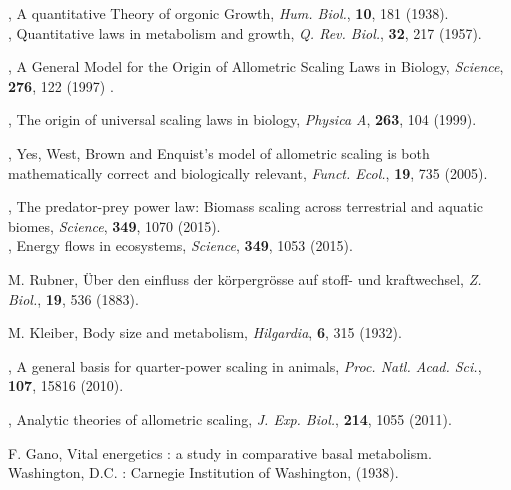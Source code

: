 \documentclass[10pt]{iopart}
\begin{document}
%
\begin{thebibliography}{100}

, {A quantitative Theory of orgonic Growth}, \textit{Hum. Biol.}, \textbf{10}, {181} {(1938)}. \\

, {Quantitative laws in metabolism and growth}, \textit{Q. Rev. Biol.}, \textbf{32}, {217} {(1957)}.

, {A General Model for the Origin of Allometric Scaling Laws in Biology}, \textit{Science}, \textbf{276}, {122} {(1997)} .

, { The origin of universal scaling laws in biology}, \textit{Physica A}, \textbf{263}, {104} {(1999)}.

, {Yes, West, Brown and Enquist's model of allometric scaling is both mathematically correct and biologically relevant}, \textit{Funct. Ecol.}, \textbf{19}, 735 {(2005)}.

, {The predator-prey power law: Biomass scaling across terrestrial and aquatic biomes}, \textit{Science}, \textbf{349}, {1070} {(2015)}. \\

, {Energy flows in ecosystems}, \textit{Science}, \textbf{349},  {1053} {(2015)}.

 M. Rubner, {{\"{U}}ber den einfluss der k{\"{o}}rpergr{\"{o}}sse auf stoff- und kraftwechsel}, \textit{Z. Biol.}, \textbf{19},  536 (1883).

 M. Kleiber, {Body size and metabolism}, \textit{Hilgardia}, \textbf{6}, 315 (1932).

, {A general basis for quarter-power scaling in animals}, \textit{Proc. Natl. Acad. Sci.}, \textbf{107}, {15816} {(2010)}.

, {Analytic theories of allometric scaling}, \textit{J. Exp. Biol.}, \textbf{214}, 1055 {(2011)}.

 {F. Gano}, {Vital energetics : a study in comparative basal metabolism}. {Washington, D.C. : Carnegie Institution of Washington}, {(1938)}.


\end{thebibliography}
\end{document}
